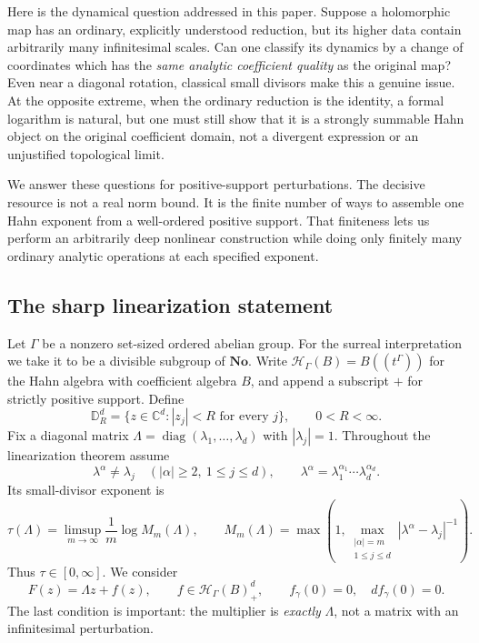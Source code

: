 \documentclass[11pt,letterpaper]{article}
\theoremstyle{definition}
\theoremstyle{remark}
\newcommand{\C}{\mathbb C}
\newcommand{\No}{\mathbf{No}}
\newcommand{\HH}{\mathscr H}
\newcommand{\DR}{\mathbb D_R^d}
\numberwithin{equation}{section}
\begin{document}
Here is the dynamical question addressed in this paper. Suppose a holomorphic
map has an ordinary, explicitly understood reduction, but its higher data
contain arbitrarily many infinitesimal scales. Can one classify its dynamics
by a change of coordinates which has the \emph{same analytic coefficient
quality} as the original map? Even near a diagonal rotation, classical small
divisors make this a genuine issue. At the opposite extreme, when the
ordinary reduction is the identity, a formal logarithm is natural, but one
must still show that it is a strongly summable Hahn object on the original
coefficient domain, not a divergent expression or an unjustified topological
limit.

We answer these questions for positive-support perturbations. The decisive
resource is not a real norm bound. It is the finite number of ways to assemble
one Hahn exponent from a well-ordered positive support. That finiteness lets
us perform an arbitrarily deep nonlinear construction while doing only
finitely many ordinary analytic operations at each specified exponent.

\subsection{The sharp linearization statement}
Let $\Gamma$ be a nonzero set-sized ordered abelian group. For the surreal
interpretation we take it to be a divisible subgroup of $\No$. Write
$\HH_\Gamma(B)=B((t^\Gamma))$ for the Hahn algebra with coefficient algebra
$B$, and append a subscript $+$ for strictly positive support. Define
\[
 \DR=\{z\in\C^d: |z_j|<R\text{ for every }j\},\qquad 0<R<\infty.
\]
Fix a diagonal matrix $\Lambda=\operatorname{diag}(\lambda_1,\ldots,\lambda_d)$
with $|\lambda_j|=1$. Throughout the linearization theorem assume
\begin{equation}\label{eq:nonres}
 \lambda^\alpha\ne\lambda_j
 \quad (|\alpha|\ge2,\ 1\le j\le d),\qquad
 \lambda^\alpha=\lambda_1^{\alpha_1}\cdots\lambda_d^{\alpha_d}.
\end{equation}
Its small-divisor exponent is
\begin{equation}\label{eq:tauintro}
 \tau(\Lambda)=\limsup_{m\to\infty}\frac1m\log M_m(\Lambda),\qquad
 M_m(\Lambda)=\max\left(1,\max_{\substack{|\alpha|=m\\1\le j\le d}}
                    |\lambda^\alpha-\lambda_j|^{-1}\right).
\end{equation}
Thus $\tau\in[0,\infty]$. We consider
\begin{equation}\label{eq:Fintro}
 F(z)=\Lambda z+f(z),\qquad f\in\HH_\Gamma(B)_+^d,
 \qquad f_\gamma(0)=0,\quad df_\gamma(0)=0.
\end{equation}
The last condition is important: the multiplier is \emph{exactly} $\Lambda$,
not a matrix with an infinitesimal perturbation.
\end{document}
